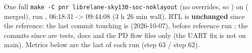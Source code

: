 \begin{record}

One full
\texttt{make\ -\allowbreak{}C\ pnr\ librelane-\allowbreak{}sky130-\allowbreak{}soc-\allowbreak{}noklayout}
(no overrides, so ) on
  ( merged), run
, 06:18:31 -\textgreater{} 09:44:08 (3 h
26 min wall). RTL is \textbf{unchanged} since the reference: the last
commit touching  is  (2026-10-07), before
reference run ; the commits since
 are tests, docs and the PD flow files only (the
 UART fix is not on main). Metrics below are the last
 of each run (step 63 / step 62).

{\footnotesize\setlength{\tabcolsep}{3pt}

}
\end{record}
